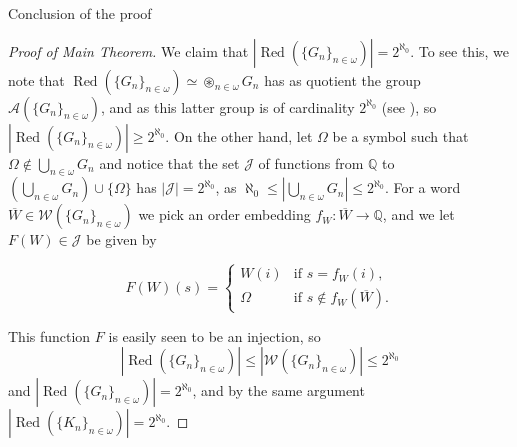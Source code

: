 \documentclass{amsart}
\theoremstyle{definition}\newtheorem{theorem}{Theorem}
\theoremstyle{definition}\newtheorem*{A}{Main Theorem}
\theoremstyle{definition}\newtheorem*{B}{Theorem \ref{elementaryequiv}}
\theoremstyle{definition}\newtheorem*{C}{Theorem \ref{continuous}}
\theoremstyle{definition}\newtheorem*{D}{Theorem \ref{bigisomorphism2}}
\theoremstyle{definition}\newtheorem{bigtheorem}{Main Theorem}
\numberwithin{theorem}{section}
\theoremstyle{definition}\newtheorem{corollary}[theorem]{Corollary}
\theoremstyle{definition}\newtheorem{proposition}[theorem]{Proposition}
\theoremstyle{definition}\newtheorem{definition}[theorem]{Definition}
\theoremstyle{definition}\newtheorem{question}[theorem]{Question}
\theoremstyle{definition}\newtheorem{example}[theorem]{Example}
\theoremstyle{definition}\newtheorem{remark}[theorem]{Remark}
\theoremstyle{definition}\newtheorem{note}[theorem]{Note}
\theoremstyle{definition}\newtheorem{lemma}[theorem]{Lemma}
\theoremstyle{definition}\newtheorem{fact}[theorem]{Fact}
\theoremstyle{definition}\newtheorem{define}[theorem]{Definition}
\theoremstyle{definition}\newtheorem{claim}[theorem]{Claim}
\theoremstyle{definition}\newtheorem{obs}[theorem]{Observation}
\theoremstyle{definition}\newtheorem{definitions}[theorem]{Definitions}
\newcommand{\Red}{\operatorname{Red}}
\newcommand{\W}{\mathcal{W}}
\DeclareMathOperator{\topprod}{\circledast}
\begin{document}
\begin{section}{Conclusion of the proof}
\begin{proof}[Proof of Main Theorem]
We claim that $|\Red(\{G_n\}_{n \in \omega})| = 2^{\aleph_0}$.  To see this, we note that $\Red(\{G_n\}_{n \in \omega}) \simeq \topprod_{n\in \omega} G_n$ has as quotient the group $\mathcal{A}(\{G_n\}_{n \in \omega})$, and as this latter group is of cardinality $2^{\aleph_0}$ (see \cite[Theorem 9]{CHM}), so $|\Red(\{G_n\}_{n \in \omega})| \geq 2^{\aleph_0}$.  On the other hand, let $\Omega$ be a symbol such that $\Omega \notin \bigcup_{n \in \omega} G_n$ and notice that the set $\mathcal{J}$ of functions from $\mathbb{Q}$ to $(\bigcup_{n \in \omega} G_n) \cup\{\Omega\}$ has $|\mathcal{J}| = 2^{\aleph_0}$, as $\aleph_0 \leq |\bigcup_{n \in \omega} G_n| \leq 2^{\aleph_0}$.  For a word $\overline{W} \in \W(\{G_n\}_{n \in \omega})$ we pick an order embedding $f_W: \overline{W} \rightarrow \mathbb{Q}$, and we let $F(W) \in \mathcal{J}$ be given by



\[
F(W)(s) = \left\{
\begin{array}{ll}
W(i)
                                            & \text{if } s = f_W(i), \\
\Omega                                & \text{if } s\notin f_W(\overline{W}).
\end{array}
\right.
\]

\noindent This function $F$ is easily seen to be an injection, so $$|\Red(\{G_n\}_{n \in \omega})| \leq |\W(\{G_n\}_{n \in \omega})| \leq 2^{\aleph_0}$$ and $|\Red(\{G_n\}_{n \in \omega})| = 2^{\aleph_0}$, and by the same argument $|\Red(\{K_n\}_{n \in \omega})| = 2^{\aleph_0}$.


\end{proof}
\end{section}
\end{document}
